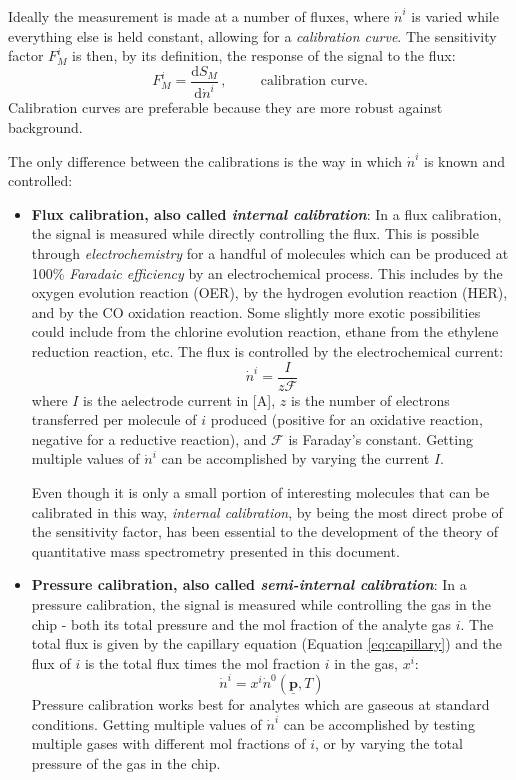 \documentclass{article}
\renewcommand{\vec}[1]{\underline{\mathbf{#1}}}
\begin{document}
Ideally the measurement is made at a number of fluxes, where $\dot{n}^i$ is varied while everything else is held constant, allowing for a \textit{calibration curve}. The sensitivity factor $F_M^i$ is then, by its definition, the response of the signal to the flux:
\begin{equation}
F_M^i = \frac{\mathrm{d}S_M}{\mathrm{d}\dot{n}^i}\,, \hspace{1cm} \text{calibration curve.}
\end{equation} 
Calibration curves are preferable because they are more robust against background.

The only difference between the calibrations is the way in which $\dot{n}^i$ is known and controlled:

\begin{itemize}
	\item \textbf{Flux calibration, also called \textit{internal calibration}}: In a flux calibration, the signal is measured while directly controlling the flux. This is possible through \textit{electrochemistry} for a handful of molecules which can be produced at 100\% \textit{Faradaic efficiency} by an electrochemical process. This includes  by the oxygen evolution reaction (OER),  by the hydrogen evolution reaction (HER), and  by the CO oxidation reaction. Some slightly more exotic possibilities could include  from the chlorine evolution reaction, ethane from the ethylene reduction reaction, etc. The flux is controlled by the electrochemical current:
	\begin{equation}
	\dot{n}^i = \frac{I}{z\mathcal{F}}
	\end{equation}
	where $I$ is the aelectrode current in [A], $z$ is the number of electrons transferred per molecule of $i$ produced (positive for an oxidative reaction, negative for a reductive reaction), and $\mathcal{F}$ is Faraday's constant. Getting multiple values of $\dot{n}^i$ can be accomplished by varying the current $I$.
	
	Even though it is only a small portion of interesting molecules that can be calibrated in this way, \textit{internal calibration}, by being the most direct probe of the sensitivity factor, has been essential to the development of the theory of quantitative mass spectrometry presented in this document.
	
	\item \textbf{Pressure calibration, also called \textit{semi-internal calibration}}: In a pressure calibration, the signal is measured while controlling the gas in the chip - both its total pressure and the mol fraction of the analyte gas $i$. The total flux is given by the capillary equation (Equation \ref{eq:capillary}) and the flux of $i$ is the total flux times the mol fraction $i$ in the gas, $x^i$:
	\begin{equation}
	\dot{n}^i = x^i \dot{n}^0(\vec{p}, T)
	\end{equation}
	Pressure calibration works best for analytes which are gaseous at standard conditions. Getting multiple values of $\dot{n}^i$ can be accomplished by testing multiple gases with different mol fractions of $i$, or by varying the total pressure of the gas in the chip.
	

\end{itemize}
\end{document}
